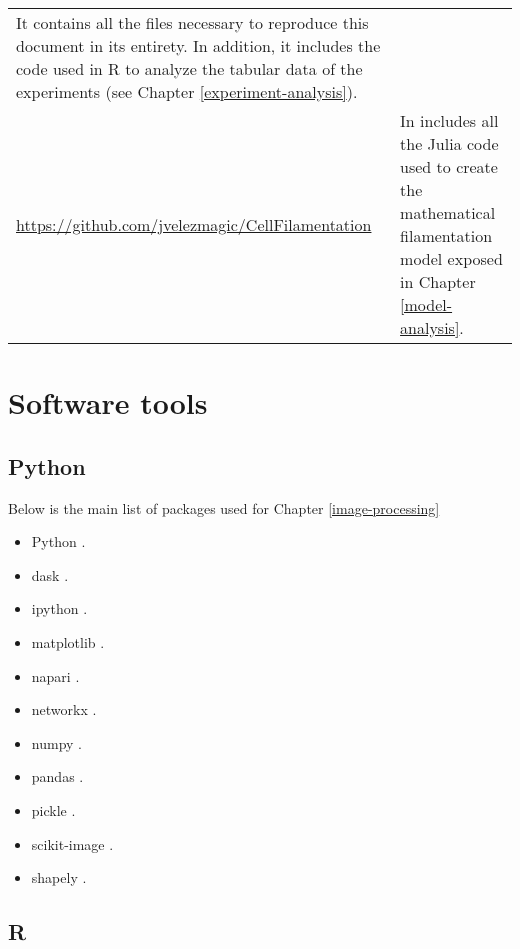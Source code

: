 \documentclass[
  12pt,
  a4paper,
  oneside]{krantz}
\begin{document}
\begin{longtable}[]{@{}ll@{}}
\begin{minipage}[t]{0.79\columnwidth}
It contains all the files necessary to reproduce this document in its entirety. In addition, it includes the code used in R to analyze the tabular data of the experiments (see Chapter \ref{experiment-analysis}).\strut
\end{minipage}\tabularnewline
\begin{minipage}[t]{0.15\columnwidth}\raggedright
\url{https://github.com/jvelezmagic/CellFilamentation}\strut
\end{minipage} & \begin{minipage}[t]{0.79\columnwidth}\raggedright
In includes all the Julia code used to create the mathematical filamentation model exposed in Chapter \ref{model-analysis}.\strut
\end{minipage}\tabularnewline
\bottomrule
\end{longtable}

\hypertarget{software-tools}{%
\chapter{Software tools}\label{software-tools}}

\hypertarget{python}{%
\section{Python}\label{python}}

Below is the main list of packages used for Chapter
\ref{image-processing}

\begin{itemize}
\item
  Python \citep{10.5555/1593511}.
\item
  dask \citep{rocklin2015dask}.
\item
  ipython \citep{perez2007ipython}.
\item
  matplotlib \citep{hunter2007matplotlib}.
\item
  napari \citep{sofroniew2021a}.
\item
  networkx \citep{hagberg2008exploring}.
\item
  numpy \citep{2020NumPy-Array}.
\item
  pandas \citep{mckinney2010data}.
\item
  pickle \citep{van1995python}.
\item
  scikit-image \citep{vanderwalt2014}.
\item
  shapely \citep{shapely2007}.
\end{itemize}

\hypertarget{r}{%
\section{R}\label{r}}
\end{document}
